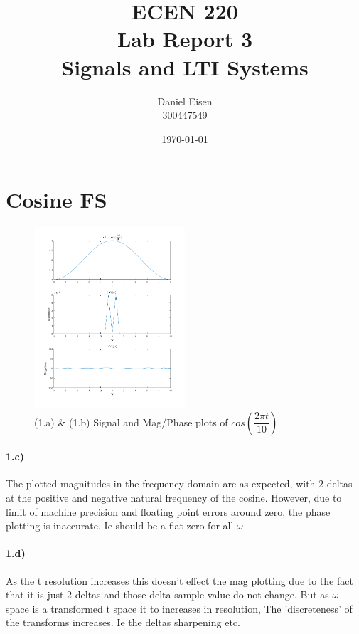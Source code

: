 \documentclass[11pt]{article}
\title{ECEN 220 \\ Lab Report 3 \\ Signals and LTI Systems}
\author{Daniel Eisen \\ 300447549}
\date{\today}
\begin{document}
\maketitle
\section{Cosine FS}
\begin{figure}[h]
\begin{center}
\includegraphics[width=0.5\textwidth]{q1}
\caption{(1.a) \& (1.b) Signal and Mag/Phase plots of $cos(\dfrac{2{\pi}t}{10})$}
\end{center}
\end{figure}
\paragraph*{1.c)}
The plotted magnitudes in the frequency domain are as expected, with 2 deltas at the positive and negative natural frequency of the cosine. However, due to limit of machine precision and floating point errors around zero, the phase plotting is inaccurate. Ie should be a flat zero for all $\omega$
\paragraph*{1.d)}
As the t resolution increases this doesn't effect the mag plotting due to the fact that it is just 2 deltas and those delta sample value do not change.
But as $\omega$ space is a transformed t space it to increases in resolution,
The 'discreteness' of the transforms increases. Ie the deltas sharpening etc.
\end{document}
